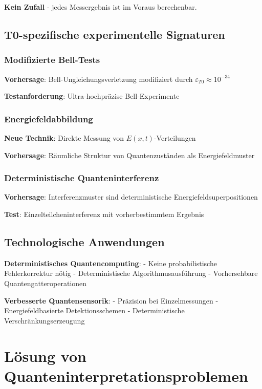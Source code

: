 \documentclass[12pt,a4paper]{article}
\newcommand{\Efield}{E}
\begin{document}
	\textbf{Kein Zufall} - jedes Messergebnis ist im Voraus berechenbar.
	
	\subsection{T0-spezifische experimentelle Signaturen}
	
	\subsubsection{Modifizierte Bell-Tests}
	
	\textbf{Vorhersage}: Bell-Ungleichungsverletzung modifiziert durch $\varepsilon_{T0} \approx 10^{-34}$
	
	\textbf{Testanforderung}: Ultra-hochpräzise Bell-Experimente
	
	\subsubsection{Energiefeldabbildung}
	
	\textbf{Neue Technik}: Direkte Messung von $\Efield(x,t)$-Verteilungen
	
	\textbf{Vorhersage}: Räumliche Struktur von Quantenzuständen als Energiefeldmuster
	
	\subsubsection{Deterministische Quanteninterferenz}
	
	\textbf{Vorhersage}: Interferenzmuster sind deterministische Energiefeldsuperpositionen
	
	\textbf{Test}: Einzelteilcheninterferenz mit vorherbestimmtem Ergebnis
	
	\subsection{Technologische Anwendungen}
	
	\textbf{Deterministisches Quantencomputing}:
	- Keine probabilistische Fehlerkorrektur nötig
	- Deterministische Algorithmusausführung
	- Vorhersehbare Quantengatteroperationen
	
	\textbf{Verbesserte Quantensensorik}:
	- Präzision bei Einzelmessungen
	- Energiefeldbasierte Detektionsschemen
	- Deterministische Verschränkungserzeugung
	
	\section{Lösung von Quanteninterpretationsproblemen}
	
\end{document}

